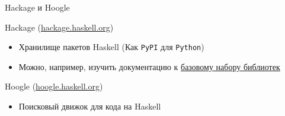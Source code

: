 \documentclass{beamer}
\begin{document}
  \begin{frame}{Hackage и Hoogle}
      \begin{block}{Hackage (\url{hackage.haskell.org})}
        \begin{itemize}
            \item Хранилище пакетов Haskell (Как \texttt{PyPI} для \texttt{Python})
            \item Можно, например, изучить документацию к \alert{\href{https://hackage.haskell.org/package/base}{базовому набору библиотек}}
        \end{itemize}
      \end{block}
      \begin{block}{Hoogle (\url{hoogle.haskell.org})}
        \begin{itemize}
            \item Поисковый движок для кода на Haskell
        \end{itemize}
      \end{block}
  \end{frame}
\end{document}
